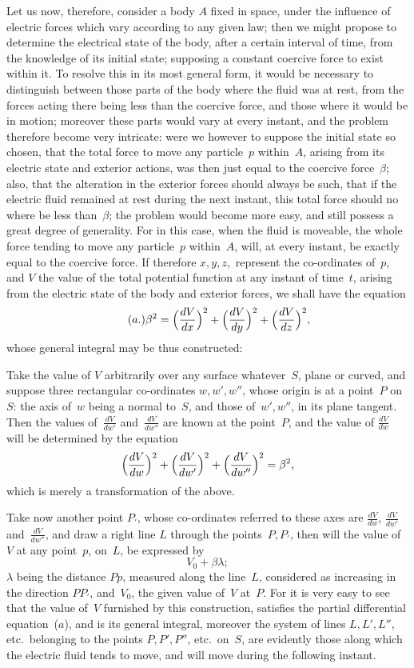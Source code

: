 \documentclass[12pt,notitlepage]{amsart}
\begin{document}
Let us now, therefore, consider a body $A$ fixed in space, under the
influence of electric forces which vary according to any given law; then we
might propose to determine the electrical state of the body, after a certain
interval of time, from the knowledge of its initial state; supposing a constant
coercive force to exist within it. To resolve this in its most general form,
it would be necessary to distinguish between those parts of the body where
the fluid was at rest, from the forces acting there being less than the 
coercive force, and those where it would be in motion; moreover these parts
would vary at every instant, and the problem therefore become very intricate:
were we however to suppose the initial state so chosen, that the total force
to move any particle~$p$ within~$A$,
arising from its electric state and exterior
actions, was then just equal to the coercive force~$\beta$;
also, that the alteration
in the exterior forces should always be such, that if the electric fluid 
remained at rest during the next instant, this total force should no where be
less than~$\beta$;
the problem would become more easy, and still possess a great
degree of generality. For in this case, when the fluid is moveable, the whole
force tending to move any particle~$p$ within~$A$, will, at every instant, be
exactly equal to the coercive force. If therefore $x,y,z,$ represent the
co-ordinates of~$p$, and $V$ the value of the total
potential function at any instant
of time~$t$, arising from the electric state of the body and exterior forces, we
shall have the equation
\[
\tag{$a$.}
\beta^2=
\Bigl(\frac{dV}{dx}\Bigr)^2
+\Bigl(\frac{dV}{dy}\Bigr)^2
+\Bigl(\frac{dV}{dz}\Bigr)^2,
\]
whose general integral may be thus constructed:

Take the value of $V$ arbitrarily over any surface whatever~$S$, plane
or curved, and suppose three rectangular co-ordinates $w,w',w''$, whose
origin is at a point~$P$ on~$S$: the axis of~$w$ being a normal to~$S$,
and those of~$w',w''$, in its plane tangent.
Then the values of~$\frac{dV}{dw'}$ and~$\frac{dV}{dw''}$ are known
at the point~$P$,
and the value of $\frac{dV}{dw}$ will be determined by the equation
\[
\Bigl(\frac{dV}{dw}\Bigr)^2
+\Bigl(\frac{dV}{dw'}\Bigr)^2
+\Bigl(\frac{dV}{dw''}\Bigr)^2=\beta^2,
\]
which is merely a transformation of the above.

Take now another point $P_\prime$, whose co-ordinates referred to these
axes are $\frac{dV}{dw}$, $\frac{dV}{dw'}$ and~$\frac{dV}{dw''}$,
and draw a right line $L$ through the points~$P,P_\prime$,
then will the value of~$V$ at any point~$p$, on~$L$, be expressed by
\[
V_0+\beta\lambda;
\]
$\lambda$ being the distance $Pp$, measured along the line~$L$,
considered as increasing
in the direction $PP_\prime$, and~$V_0$,
the given value of~$V$ at~$P$. For it is very
easy to see that the value of~$V$ furnished by this construction, satisfies the
partial differential equation~($a$),
and is its general integral, moreover the system
of lines $L, L', L''$, etc.\ belonging to the
points $P, P', P''$, etc.\ on~$S$, are
evidently those along which the electric fluid tends to move, and will move
during the following instant.
\end{document}
